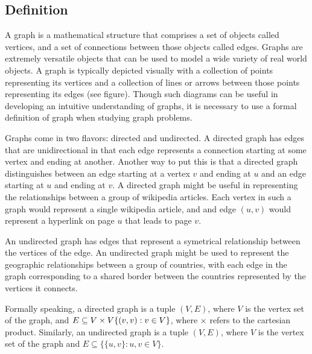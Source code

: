 \documentclass[12pt,twoside]{reedthesis}
\begin{document}
\subsection{Definition}
A graph is a mathematical structure that comprises a set of objects called vertices, and a set of connections between those objects called edges. Graphs are extremely versatile objects that can be used to model a wide variety of real world objects. A graph is typically depicted visually with a collection of points representing its vertices and a collection of lines or arrows between those points representing its edges (see figure). Though such diagrams can be useful in developing an intuitive understanding of graphs, it is necessary to use a formal definition of graph when studying graph problems.

Graphs come in two flavors: directed and undirected. A directed graph has edges that are unidirectional in that each edge represents a connection starting at some vertex and ending at another. Another way to put this is that a directed graph distinguishes between an edge starting at a vertex $v$ and ending at $u$ and an edge starting at $u$ and ending at $v$. A directed graph might be useful in representing the relationships between a group of wikipedia articles. Each vertex in such a graph would represent a single wikipedia article, and and edge $(u,v)$ would represent a hyperlink on page $u$ that leads to page $v$.

An undirected graph has edges that represent a symetrical relationship between the vertices of the edge. An undirected graph might be used to represent the geographic relationships between a group of countries, with each edge in the graph corresponding to a shared border between the countries represented by the vertices it connects.

Formally speaking, a directed graph is a tuple $(V,E)$, where $V$ is the vertex set of the graph,  and $E \subseteq V \times V \\ \{(v,v) : v \in V\}$, where $\times$ refers to the cartesian product.
Similarly, an undirected graph is a tuple $(V,E)$, where $V$ is the vertex set of the graph and $E \subseteq \{ \{u,v\} : u,v \in V \}$.


\end{document}
